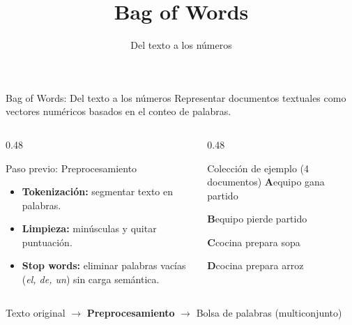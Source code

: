 \documentclass[aspectratio=169,10pt]{beamer}
\date{}
\title{Bag of Words}
\subtitle{Del texto a los números}
\begin{document}
\begin{frame}[label={sec:org99110d2}]{Bag of Words: Del texto a los números}
\vspace{-0.5em}
Representar documentos textuales como \alert{vectores numéricos} basados en el conteo de palabras.

\medskip
\begin{columns}[T,onlytextwidth]
  \begin{column}{0.48\textwidth}
    \begin{block}{Paso previo: Preprocesamiento}
      \begin{itemize}\setlength{\itemsep}{0.2em}
        \item \textbf{Tokenización:} segmentar texto en palabras.
        \item \textbf{Limpieza:} minúsculas y quitar puntuación.
        \item \textbf{Stop words:} eliminar palabras vacías (\textit{el, de, un}) sin carga semántica.
      \end{itemize}
    \end{block}
  \end{column}

  \begin{column}{0.48\textwidth}
    \begin{block}{Colección de ejemplo (4 documentos)}
      \textbf{A}\quad equipo gana partido\par\smallskip
      \textbf{B}\quad equipo pierde partido\par\smallskip
      \textbf{C}\quad cocina prepara sopa\par\smallskip
      \textbf{D}\quad cocina prepara arroz
    \end{block}
  \end{column}
\end{columns}

\bigskip
\begin{center}
  \small
  Texto original $\longrightarrow$ \textbf{Preprocesamiento} $\longrightarrow$ \alert{Bolsa de palabras (multiconjunto)}
\end{center}
\end{frame}
\end{document}
